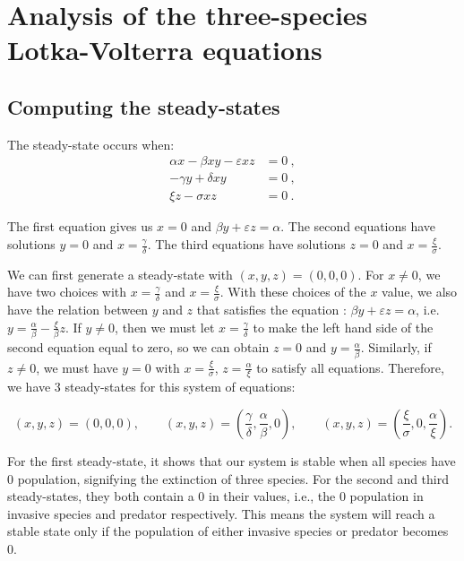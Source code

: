 \documentclass{article}
\begin{document}
\section{Analysis of the three-species Lotka-Volterra equations}

\subsection{Computing the steady-states} %
The steady-state occurs when:
$$
\begin{aligned}
\alpha x - \beta xy - \varepsilon xz &= 0 \ ,\\
-\gamma y + \delta xy &= 0 \ ,\\
\xi z - \sigma xz &= 0 \ .
\end{aligned}
$$

\noindent The first equation gives us $x = 0$ and $\beta y + \varepsilon z = \alpha$. The second equations have solutions $y=0$ and $x = \frac{\gamma}{\delta}$. The third equations have solutions $z = 0$ and $x = \frac{\xi}{\sigma}$.

\vspace{5mm}

\noindent We can first generate a steady-state with $(x,y,z) = (0, 0, 0)$. For $x \ne 0$, we have two choices with $x = \frac{\gamma}{\delta}$ and $x = \frac{\xi}{\sigma}$. With these choices of the $x$ value, we also have the relation between $y$ and $z$ that satisfies the equation : $\beta y + \varepsilon z = \alpha$, i.e. $y = \frac{\alpha}{\beta} - \frac{\xi}{\beta}z$. If $y \ne 0$, then we must let $x = \frac{\gamma}{\delta}$ to make the left hand side of the second equation equal to zero, so we can obtain $z = 0$  and $y = \frac{\alpha}{\beta}$. Similarly, if $z \ne 0$, we must have $y=0$ with $x = \frac{\xi}{\sigma}$, $z = \frac{\alpha}{\xi}$ to satisfy all equations. Therefore, we have 3 steady-states for this system of equations:

$$
(x,y,z) = (0, 0, 0), \qquad (x,y,z) = (\frac{\gamma}{\delta}, \frac{\alpha}{\beta}, 0), \qquad (x,y,z) = (\frac{\xi}{\sigma}, 0, \frac{\alpha}{\xi}).
$$

\vspace{3mm}

\noindent For the first steady-state, it shows that our system is stable when all species have 0 population, signifying the extinction of three species. For the second and third steady-states, they both contain a 0 in their values, i.e., the 0 population in invasive species and predator respectively. This means the system will reach a stable state only if the population of either invasive species or predator becomes 0.
\end{document}
